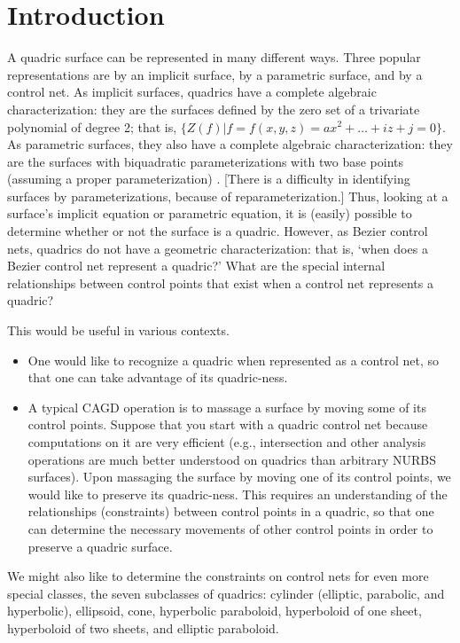 \clearpage

\section{Introduction}

A quadric surface can be represented in many different 
ways. Three popular representations are by an implicit surface, 
by a parametric surface, and by a control net. 
As implicit surfaces, quadrics have a complete algebraic characterization:
they are the surfaces defined by the zero set of a trivariate polynomial 
of degree 2; that is, $\{Z(f) | f = f(x,y,z) = ax^2 + \ldots + iz + j = 0\}$.
As parametric surfaces, they also have a complete algebraic characterization:
they are the surfaces with biquadratic parameterizations with two base points
(assuming a proper parameterization)
\cite{Seder90a,Seder90b,Seder85}.
[There is a difficulty in identifying surfaces by parameterizations, because
of reparameterization.]
Thus, looking at a surface's implicit equation or parametric equation, 
it is (easily) possible to determine whether or not the surface is a quadric.
However, as Bezier control nets, quadrics do not have a geometric 
characterization: that is, `when does a Bezier control net represent a quadric?'
What are the special internal relationships between control points that exist
when a control net represents a quadric?

This would be useful in various contexts.
\begin{itemize}
\item 
One would like to recognize a quadric when represented as a control net,
so that one can take advantage of its quadric-ness.
\item
A typical CAGD operation is to massage a surface
by moving some of its control points.
Suppose that you start with a quadric control net because computations on it
are very efficient (e.g., intersection and other analysis operations are 
much better understood on quadrics than arbitrary NURBS surfaces).
Upon massaging the surface by moving one of its control points,
we would like to preserve its quadric-ness.
This requires an understanding of the 
relationships (constraints) between control points in a quadric,
so that one can determine the necessary movements of other control points in order
to preserve a quadric surface.
\end{itemize}

We might also like to determine the constraints on control nets for
even more special classes, the seven subclasses of quadrics:
cylinder (elliptic, parabolic, and hyperbolic), ellipsoid, cone,
hyperbolic paraboloid, hyperboloid of one sheet, hyperboloid of two sheets,
and elliptic paraboloid.




